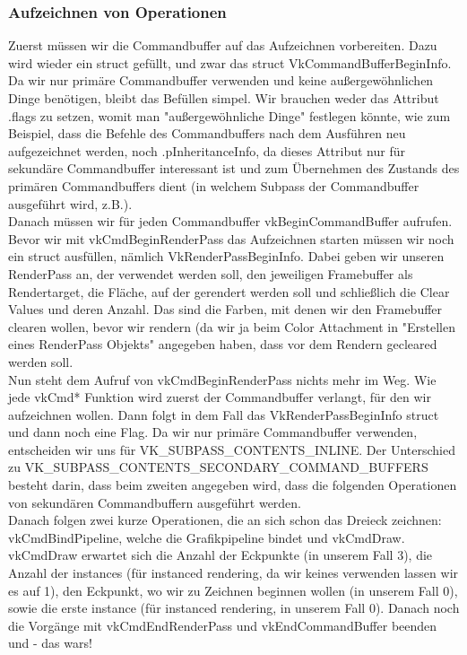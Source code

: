 \documentclass[11pt,a4paper]{report}
\begin{document}
\subsubsection{Aufzeichnen von Operationen}
Zuerst müssen wir die Commandbuffer auf das Aufzeichnen vorbereiten. Dazu wird wieder ein struct gefüllt, und zwar das struct VkCommandBufferBeginInfo. Da wir nur primäre Commandbuffer verwenden und keine außergewöhnlichen Dinge benötigen, bleibt das Befüllen simpel. Wir brauchen weder das Attribut .flags zu setzen, womit man "außergewöhnliche Dinge" festlegen könnte, wie zum Beispiel, dass die Befehle des Commandbuffers nach dem Ausführen neu aufgezeichnet werden, noch .pInheritanceInfo, da dieses Attribut nur für sekundäre Commandbuffer interessant ist und zum Übernehmen des Zustands des primären Commandbuffers dient (in welchem Subpass der Commandbuffer ausgeführt wird, z.B.).\\
Danach müssen wir für jeden Commandbuffer vkBeginCommandBuffer aufrufen. Bevor wir mit vkCmdBeginRenderPass das Aufzeichnen starten müssen wir noch ein struct ausfüllen, nämlich VkRenderPassBeginInfo. Dabei geben wir unseren RenderPass an, der verwendet werden soll, den jeweiligen Framebuffer als Rendertarget, die Fläche, auf der gerendert werden soll und schließlich die Clear Values und deren Anzahl. Das sind die Farben, mit denen wir den Framebuffer clearen wollen, bevor wir rendern (da wir ja beim Color Attachment in "Erstellen eines RenderPass Objekts" angegeben haben, dass vor dem Rendern gecleared werden soll.\\
Nun steht dem Aufruf von vkCmdBeginRenderPass nichts mehr im Weg. Wie jede vkCmd* Funktion wird zuerst der Commandbuffer verlangt, für den wir aufzeichnen wollen. Dann folgt in dem Fall das VkRenderPassBeginInfo struct und dann noch eine Flag. Da wir nur primäre Commandbuffer verwenden, entscheiden wir uns für VK\_SUBPASS\_CONTENTS\_INLINE. Der Unterschied zu VK\_SUBPASS\_CONTENTS\_SECONDARY\_COMMAND\_BUFFERS besteht darin, dass beim zweiten angegeben wird, dass die folgenden Operationen von sekundären Commandbuffern ausgeführt werden.\\
Danach folgen zwei kurze Operationen, die an sich schon das Dreieck zeichnen: vkCmdBindPipeline, welche die Grafikpipeline bindet und vkCmdDraw. vkCmdDraw erwartet sich die Anzahl der Eckpunkte (in unserem Fall 3), die Anzahl der instances (für instanced rendering, da wir keines verwenden lassen wir es auf 1), den Eckpunkt, wo wir zu Zeichnen beginnen wollen (in unserem Fall 0), sowie die erste instance (für instanced rendering, in unserem Fall 0). Danach noch die Vorgänge mit vkCmdEndRenderPass und vkEndCommandBuffer beenden und - das wars!
\end{document}
